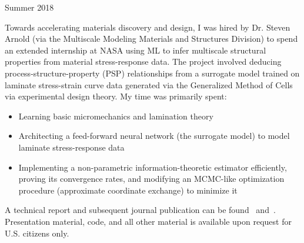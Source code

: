 \documentclass[11pt,a4paper,sans]{moderncv} %
\begin{document}
			 {Summer 2018}{}{\vspace{3pt}
Towards accelerating materials discovery and design, I was hired by Dr. Steven Arnold (via the Multiscale Modeling Materials and Structures Division) to spend an extended internship at NASA using ML to infer multiscale structural properties from material stress-response data.  
The project involved deducing process-structure-property (PSP) relationships from a surrogate model trained on laminate stress-strain curve data generated via the Generalized Method of Cells via experimental design theory.
My time was primarily spent:
\begin{itemize}
	\item Learning basic micromechanics and lamination theory
	\item Architecting a feed-forward neural network (the surrogate model) to model laminate stress-response data 
	\item Implementing a non-parametric information-theoretic estimator efficiently, proving its convergence rates, and modifying an MCMC-like optimization procedure (approximate coordinate exchange) to minimize it 
\end{itemize}	
A technical report and subsequent journal publication can be found~\cite{arnold2020multiscale} and~\cite{stuckner2021optimal}. Presentation material, code, and all other material is available upon request for U.S. citizens only. 
}
\vspace{0.75em}
\end{document}
